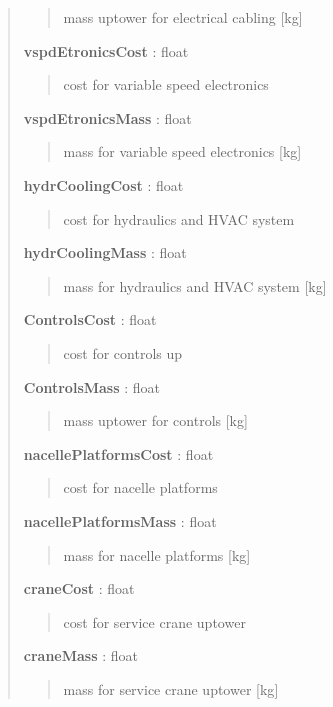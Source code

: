 \documentclass[letterpaper,10pt,openany,oneside]{sphinxmanual}
\begin{document}
\begin{fulllineitems}
\begin{quote}
\begin{description}
\begin{quote}
mass uptower for electrical cabling {[}kg{]}
\end{quote}

\textbf{vspdEtronicsCost} : float
\begin{quote}

cost for variable speed electronics
\end{quote}

\textbf{vspdEtronicsMass} : float
\begin{quote}

mass for variable speed electronics {[}kg{]}
\end{quote}

\textbf{hydrCoolingCost} : float
\begin{quote}

cost for hydraulics and HVAC system
\end{quote}

\textbf{hydrCoolingMass} : float
\begin{quote}

mass for hydraulics and HVAC system {[}kg{]}
\end{quote}

\textbf{ControlsCost} : float
\begin{quote}

cost for controls up
\end{quote}

\textbf{ControlsMass} : float
\begin{quote}

mass uptower for controls {[}kg{]}
\end{quote}

\textbf{nacellePlatformsCost} : float
\begin{quote}

cost for nacelle platforms
\end{quote}

\textbf{nacellePlatformsMass} : float
\begin{quote}

mass for nacelle platforms {[}kg{]}
\end{quote}

\textbf{craneCost} : float
\begin{quote}

cost for service crane uptower
\end{quote}

\textbf{craneMass} : float
\begin{quote}

mass for service crane uptower {[}kg{]}
\end{quote}


\end{description}
\end{quote}
\end{fulllineitems}
\end{document}
